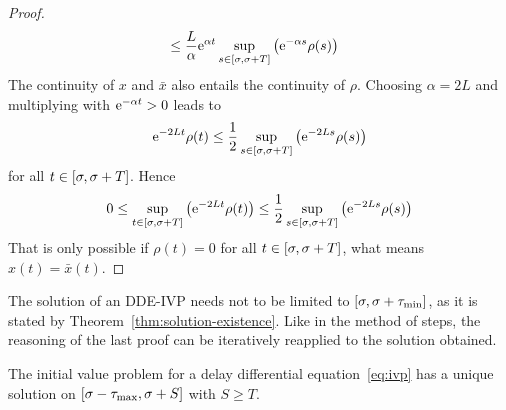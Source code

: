 \begin{proof}
\begin{align*}
            & \leq\frac{L}{\alpha}\mathrm{e}^{\alpha t} \sup_{s\in [\sigma,\sigma+T]}\left(\mathrm{e}^{-\alpha s}\rho(s)\right)
        \end{align*}
        The continuity of $x$ and $\bar{x}$ also entails the continuity of $\rho$.
        Choosing $\alpha=2L$ and multiplying with $\mathrm{e}^{-\alpha t}>0$ leads to
        \begin{equation*}
            \mathrm{e}^{-2Lt}\rho(t) \leq \frac{1}{2}\sup_{s\in [\sigma,\sigma+T]}\left(\mathrm{e}^{-2L s}\rho(s)\right)
        \end{equation*}
        for all $t\in [\sigma,\sigma+T]$. Hence
        \begin{equation*}
            0 \leq \sup_{t\in [\sigma,\sigma+T]}\left(\mathrm{e}^{-2Lt}\rho(t)\right) \leq \frac{1}{2}\sup_{s\in [\sigma,\sigma+T]}\left(\mathrm{e}^{-2L s}\rho(s)\right)
        \end{equation*}
        That is only possible if $\rho(t)=0$ for all $t\in [\sigma,\sigma+T]$, what means $x(t)=\bar{x}(t)$.
    \end{proof}

    The solution of an DDE-IVP needs not to be limited to $[\sigma,\sigma+\tau_{\min}]$, as it is stated by Theorem~\ref{thm:solution-existence}. Like in the method of steps, the reasoning of the last proof can be iteratively reapplied to the solution obtained.

    \begin{corollary}[Continuability]\label{cor:continuability}
        The initial value problem for a delay differential equation~\eqref{eq:ivp} has a unique solution on $[\sigma-\tau_{\max},\sigma+S]$ with $S\geq T$.
    \end{corollary}

